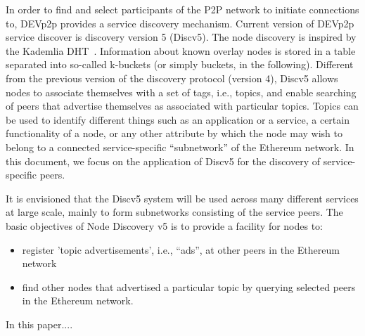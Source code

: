 In order to find and select participants of the P2P network to initiate connections to,  DEVp2p provides a service discovery mechanism. 
Current version of DEVp2p service discover is discovery version 5 (Discv5).
The node discovery is inspired by the Kademlia
DHT~\cite{}. Information about known overlay nodes is stored in
a table separated into so-called k-buckets (or simply buckets,
in the following).
Different from the previous version of the discovery protocol (version 4),  Discv5 allows nodes to associate themselves with a set of tags, i.e., topics, and enable searching of peers that advertise themselves as associated with particular topics.  Topics can be used to identify different things such as an application or a service, a certain functionality of a node, or any other attribute by which the node may wish to belong to a connected service-specific “subnetwork” of the Ethereum network. In this document, we focus on the application of Discv5 for the discovery of service-specific peers.




It is envisioned that the Discv5 system will be used across many different services at large scale, mainly to form subnetworks consisting of the service peers. The basic objectives of Node Discovery v5 is to provide a facility for nodes to:
\begin{itemize}
    \item register 'topic advertisements', i.e., “ads”, at other peers in the Ethereum network
    \item find other nodes that advertised a particular topic by querying selected peers in the Ethereum network.
\end{itemize}

In this paper....
    
    
